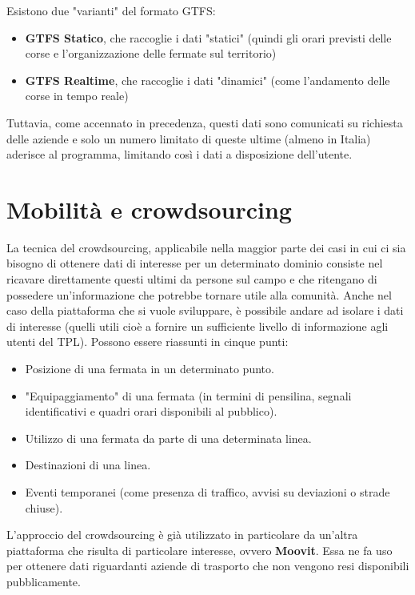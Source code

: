     Esistono due "varianti" del formato GTFS:
    \begin{itemize}
        \item \textbf{GTFS Statico}, che raccoglie i dati "statici" (quindi gli orari previsti delle corse e l'organizzazione delle fermate sul territorio)
        \item \textbf{GTFS Realtime}, che raccoglie i dati "dinamici" (come l'andamento delle corse in tempo reale)
    \end{itemize}

    Tuttavia, come accennato in precedenza, questi dati sono comunicati su richiesta delle aziende e solo un numero limitato di queste ultime (almeno in Italia) aderisce al programma, limitando così i dati a disposizione dell'utente.

\section{Mobilità e crowdsourcing}
    La tecnica del crowdsourcing, applicabile nella maggior parte dei casi in cui ci sia bisogno di ottenere dati di interesse per un determinato dominio consiste nel ricavare direttamente questi ultimi da persone sul campo e che ritengano di possedere un'informazione che potrebbe tornare utile alla comunità.
    Anche nel caso della piattaforma che si vuole sviluppare, è possibile andare ad isolare i dati di interesse (quelli utili cioè a fornire un sufficiente livello di informazione agli utenti del TPL). Possono essere riassunti in cinque punti:
            \begin{itemize}
                \item Posizione di una fermata in un determinato punto.
                \item "Equipaggiamento" di una fermata (in termini di pensilina, segnali identificativi e quadri orari disponibili al pubblico).
                \item Utilizzo di una fermata da parte di una determinata linea.
                \item Destinazioni di una linea.
                \item Eventi temporanei (come presenza di traffico, avvisi su deviazioni o strade chiuse).
            \end{itemize}

        L'approccio del crowdsourcing è già utilizzato in particolare da un'altra piattaforma che risulta di particolare interesse, ovvero \textbf{Moovit}. Essa ne fa uso per ottenere dati riguardanti aziende di trasporto che non vengono resi disponibili pubblicamente.

